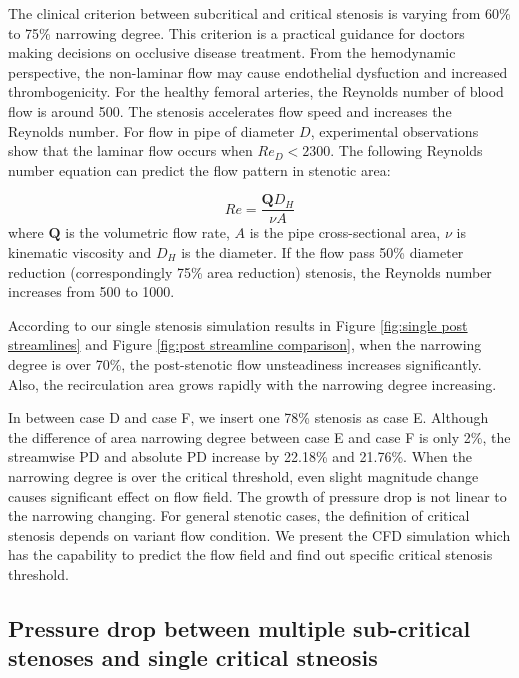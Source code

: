 The clinical criterion between subcritical and critical stenosis is varying from 60\% to 75\% narrowing degree.
This criterion is a practical guidance for doctors making decisions on occlusive disease treatment.
From the hemodynamic perspective, the non-laminar flow may cause endothelial dysfuction and increased thrombogenicity.
For the healthy femoral arteries, the Reynolds number of blood flow is around 500. 
The stenosis accelerates flow speed and increases the Reynolds number.
For flow in pipe of diameter $D$, experimental observations show that the laminar flow occurs when $Re_D < 2300$.
The following Reynolds number equation can predict the flow pattern in stenotic area:


\begin{equation}
Re = \frac{\textbf{Q} D_H}{\nu A}
\end{equation}
where $\textbf{Q}$ is the volumetric flow rate, $A$ is the pipe cross-sectional area, $\nu$ is kinematic viscosity
and $D_H$ is the diameter.
If the flow pass 50\% diameter reduction (correspondingly 75\% area reduction) stenosis, the Reynolds number increases from 500 to 1000.

According to our single stenosis simulation results in Figure \ref{fig:single post streamlines} and Figure \ref{fig:post streamline comparison}, when the narrowing degree is over 70\%, the post-stenotic flow unsteadiness increases significantly. Also, the recirculation area grows rapidly with the narrowing degree increasing.

In between case D and case F, we insert one 78\% stenosis as case E. Although the difference of area narrowing degree between case E and case F is only 2\%, the streamwise PD and absolute PD increase by 22.18\% and 21.76\%. When the narrowing degree is over the critical threshold, even slight magnitude change causes significant effect on flow field.
The growth of pressure drop is not linear to the narrowing changing.  
For general stenotic cases, the definition of critical stenosis depends on variant flow condition. 
We present the CFD simulation which has the capability to predict the flow field and find out specific critical stenosis threshold.

\subsection{Pressure drop between multiple sub-critical stenoses and single critical stneosis}

